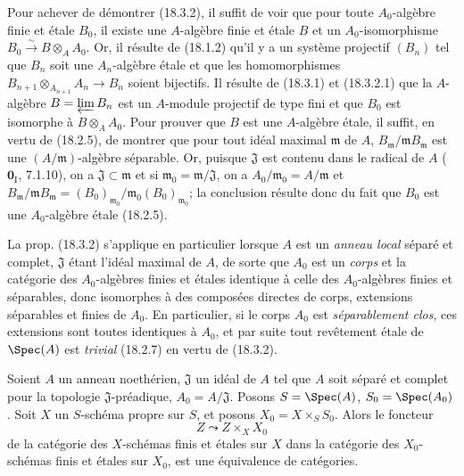Pour achever de démontrer (18.3.2), il suffit de voir que pour toute $A_0$-algèbre finie et étale $B_0$, il existe une $A$-algèbre finie et étale $B$ et un $A_0$-isomorphisme $B_0\xrightarrow{\sim}B\otimes_A A_0$. Or, il résulte de (18.1.2) qu'il y a un système projectif $(B_n)$ tel que $B_n$ soit une $A_n$-algèbre étale et que les homomorphismes $B_{n+1}\otimes_{A_{n+1}}A_n\to B_n$ soient bijectifs. Il résulte de (18.3.1) et (18.3.2.1) que la $A$-algèbre $B=\varprojlim B_n$ est un $A$-module projectif de type fini et que $B_0$ est isomorphe à $B\otimes_A A_0$. Pour prouver que $B$ est une $A$-algèbre étale, il suffit, en vertu de (18.2.5), de montrer que pour tout idéal maximal $\mathfrak m$ de $A$, $B_{\mathfrak m}/\mathfrak mB_{\mathfrak m}$ est une $(A/\mathfrak m)$-algèbre séparable. Or, puisque $\mathfrak J$ est contenu dans le radical de $A$ ($\mathbf{0}_{\mathrm I}$, 7.1.10),
on a $\mathfrak J\subset\mathfrak m$ et si $\mathfrak m_0=\mathfrak m/\mathfrak J$, on a $A_0/\mathfrak m_0=A/\mathfrak m$ et $B_{\mathfrak m}/\mathfrak mB_{\mathfrak m}=(B_0)_{\mathfrak m_0}/\mathfrak m_0(B_0)_{\mathfrak m_0}$; la conclusion résulte donc du fait que $B_0$ est une $A_0$-algèbre étale (18.2.5).

\begin{example}[18.3.3]
\label{IV.18.3.3}
La prop. (18.3.2) s'applique en particulier lorsque $A$ est un \emph{anneau local} séparé et complet, $\mathfrak J$ étant l'idéal maximal de $A$, de sorte que $A_0$ est un \emph{corps} et la catégorie des $A_0$-algèbres finies et étales identique à celle des $A_0$-algèbres finies et séparables, donc isomorphes à des composées directes de corps, extensions séparables et finies de $A_0$. En particulier, si le corps $A_0$ est \emph{séparablement clos}, ces extensions sont toutes identiques à $A_0$, et par suite tout revêtement étale de $\Spec(A)$ est \emph{trivial} (18.2.7) en vertu de (18.3.2).
\end{example}

\begin{theorem}[18.3.4]
\label{IV.18.3.4}
Soient $A$ un anneau noethérien, $\mathfrak J$ un idéal de $A$ tel que $A$ soit séparé et complet pour la topologie $\mathfrak J$-préadique, $A_0=A/\mathfrak J$. Posons $S=\Spec(A)$, $S_0=\Spec(A_0)$. Soit $X$ un $S$-schéma propre sur $S$, et posons $X_0=X\times_S S_0$. Alors le foncteur
\[
  Z\leadsto Z\times_X X_0
\]
de la catégorie des $X$-schémas finis et étales sur $X$ dans la catégorie des $X_0$-schémas finis et étales sur $X_0$, est une équivalence de catégories.
\end{theorem}

